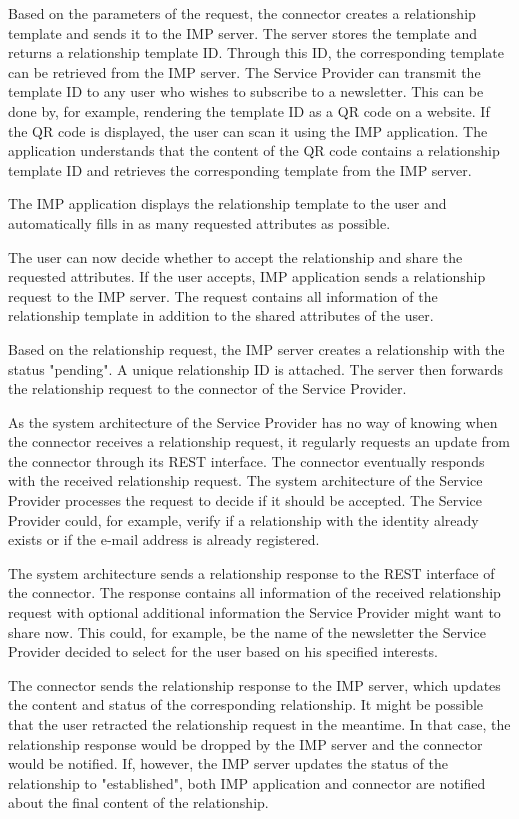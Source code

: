 Based on the parameters of the request, the connector creates a relationship template and sends it to the IMP server. The server stores the template and returns a relationship template ID. Through this ID, the corresponding template can be retrieved from the IMP server.
The Service Provider can transmit the template ID to any user who wishes to subscribe to a newsletter. This can be done by, for example, rendering the template ID as a QR code on a website.
If the QR code is displayed, the user can scan it using the IMP application. The application understands that the content of the QR code contains a relationship template ID and retrieves the corresponding template from the IMP server.

The IMP application displays the relationship template to the user and automatically fills in as many requested attributes as possible.

The user can now decide whether to accept the relationship and share the requested attributes. If the user accepts, IMP application sends a relationship request to the IMP server. The request contains all information of the relationship template in addition to the shared attributes of the user.

Based on the relationship request, the IMP server creates a relationship with the status "pending". A unique relationship ID is attached. The server then forwards the relationship request to the connector of the Service Provider.

As the system architecture of the Service Provider has no way of knowing when the connector receives a relationship request, it regularly requests an update from the connector through its REST interface. The connector eventually responds with the received relationship request. The system architecture of the Service Provider processes the request to decide if it should be accepted. The Service Provider could, for example, verify if a relationship with the identity already exists or if the e-mail address is already registered.

The system architecture sends a relationship response to the REST interface of the connector. The response contains all information of the received relationship request with optional additional information the Service Provider might want to share now. This could, for example, be the name of the newsletter the Service Provider decided to select for the user based on his specified interests.

The connector sends the relationship response to the IMP server, which updates the content and status of the corresponding relationship. It might be possible that the user retracted the relationship request in the meantime. In that case, the relationship response would be dropped by the IMP server and the connector would be notified.
If, however, the IMP server updates the status of the relationship to "established", both IMP application and connector are notified about the final content of the relationship.

